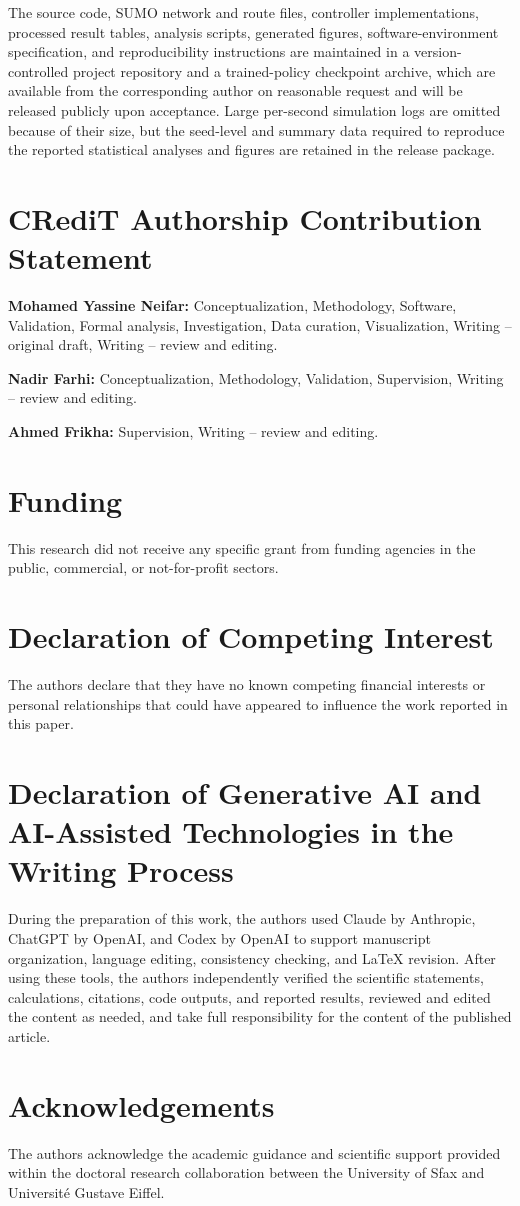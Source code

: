 \documentclass[review,12pt]{elsarticle}
\begin{document}
The source code, SUMO network and route files, controller
implementations, processed result tables, analysis scripts, generated
figures, software-environment specification, and reproducibility
instructions are maintained in a version-controlled project repository
and a trained-policy checkpoint archive, which are available from the
corresponding author on reasonable request and will be released publicly
upon acceptance. Large per-second
simulation logs are omitted because of their size, but the seed-level
and summary data required to reproduce the reported statistical analyses
and figures are retained in the release package.

\section*{CRediT Authorship Contribution Statement}

\textbf{Mohamed Yassine Neifar:} Conceptualization, Methodology, Software, Validation, Formal analysis, Investigation, Data curation, Visualization, Writing -- original draft, Writing -- review and editing.

\textbf{Nadir Farhi:} Conceptualization, Methodology, Validation, Supervision, Writing -- review and editing.

\textbf{Ahmed Frikha:} Supervision, Writing -- review and editing.

\section*{Funding}

This research did not receive any specific grant from funding agencies in the public, commercial, or not-for-profit sectors.

\section*{Declaration of Competing Interest}

The authors declare that they have no known competing financial interests or personal relationships that could have appeared to influence the work reported in this paper.

\section*{Declaration of Generative AI and AI-Assisted Technologies in the Writing Process}

During the preparation of this work, the authors used Claude by Anthropic, ChatGPT by OpenAI, and Codex by OpenAI to support manuscript organization, language editing, consistency checking, and LaTeX revision. After using these tools, the authors independently verified the scientific statements, calculations, citations, code outputs, and reported results, reviewed and edited the content as needed, and take full responsibility for the content of the published article.

\section*{Acknowledgements}

The authors acknowledge the academic guidance and scientific support provided within the doctoral research collaboration between the University of Sfax and Universit\'e Gustave Eiffel.



\end{document}
